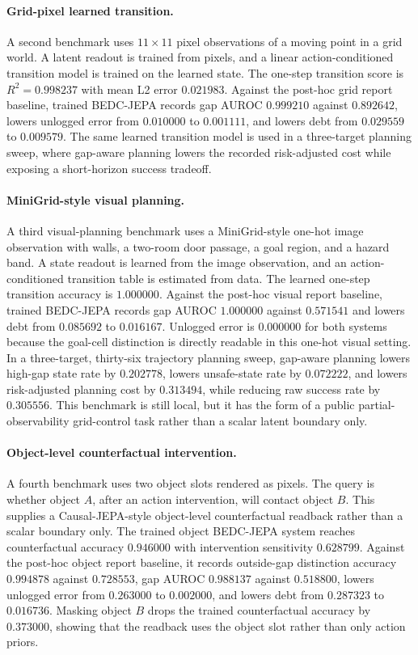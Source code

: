 \paragraph{Grid-pixel learned transition.}
A second benchmark uses $11\times 11$ pixel observations of a moving point in a
grid world.  A latent readout is trained from pixels, and a linear
action-conditioned transition model is trained on the learned state.  The
one-step transition score is $R^2=0.998237$ with mean L2 error $0.021983$.
Against the post-hoc grid report baseline, trained BEDC-JEPA records gap
AUROC $0.999210$ against $0.892642$, lowers unlogged error from $0.010000$ to
$0.001111$, and lowers debt from $0.029559$ to $0.009579$.
The same learned transition model is used in a three-target planning sweep,
where gap-aware planning lowers the recorded risk-adjusted cost while exposing
a short-horizon success tradeoff.

\paragraph{MiniGrid-style visual planning.}
A third visual-planning benchmark uses a MiniGrid-style one-hot image
observation with walls, a two-room door passage, a goal region, and a hazard
band.  A state readout is learned from the image observation, and an
action-conditioned transition table is estimated from data.  The learned
one-step transition accuracy is $1.000000$.  Against the post-hoc visual
report baseline, trained BEDC-JEPA records gap AUROC $1.000000$ against
$0.571541$ and lowers debt from $0.085692$ to $0.016167$.  Unlogged error is
$0.000000$ for both systems because the goal-cell distinction is directly
readable in this one-hot visual setting.  In a three-target, thirty-six
trajectory planning sweep, gap-aware planning lowers high-gap state rate by
$0.202778$, lowers unsafe-state rate by $0.072222$, and lowers
risk-adjusted planning cost by $0.313494$, while reducing raw success rate by
$0.305556$.  This benchmark is still local, but it has the form of a public
partial-observability grid-control task rather than a scalar latent boundary
only.

\paragraph{Object-level counterfactual intervention.}
A fourth benchmark uses two object slots rendered as pixels.  The query is
whether object $A$, after an action intervention, will contact object $B$.
This supplies a Causal-JEPA-style object-level counterfactual readback rather
than a scalar boundary only.  The trained object BEDC-JEPA system reaches
counterfactual accuracy $0.946000$ with intervention sensitivity $0.628799$.
Against the post-hoc object report baseline, it records outside-gap
distinction accuracy $0.994878$ against $0.728553$, gap AUROC $0.988137$
against $0.518800$, lowers unlogged error from $0.263000$ to $0.002000$,
and lowers debt from $0.287323$ to $0.016736$.  Masking object $B$ drops the
trained counterfactual accuracy by $0.373000$, showing that the readback uses
the object slot rather than only action priors.


